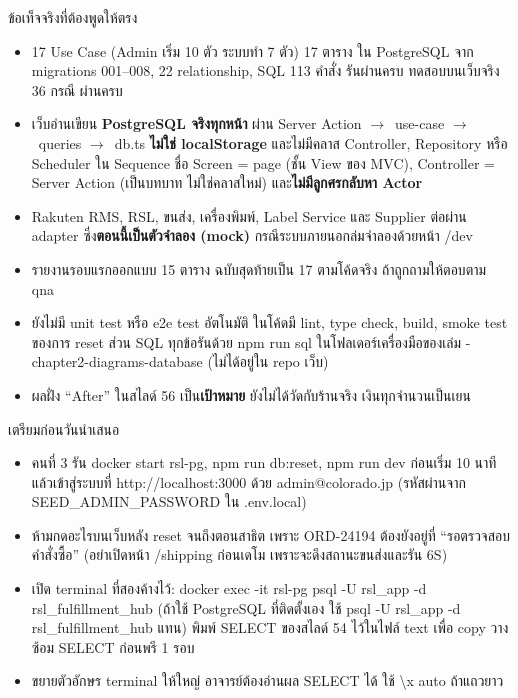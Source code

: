 \documentclass[12pt,a4paper]{article}
\newcommand{\num}[1]{{\heavy\textcolor{cur}{#1}}}
\newcommand{\q}[1]{{\mono #1}}
\newcommand{\ra}{$\rightarrow$}
\begin{document}
\vspace{8pt}
{\heavy\Large ข้อเท็จจริงที่ต้องพูดให้ตรง}\par
\begin{itemize}
  \item \num{17 Use Case} (Admin เริ่ม 10 ตัว ระบบทำ 7 ตัว) \num{17 ตาราง} ใน PostgreSQL จาก migrations 001--008, \num{22 relationship}, SQL \num{113 คำสั่ง} รันผ่านครบ ทดสอบบนเว็บจริง \num{36 กรณี} ผ่านครบ
  \item เว็บอ่านเขียน \textbf{PostgreSQL จริงทุกหน้า} ผ่าน Server Action \ra\ use-case \ra\ queries \ra\ db.ts \textbf{ไม่ใช่ localStorage} และไม่มีคลาส Controller, Repository หรือ Scheduler ใน Sequence ชื่อ Screen = page (ชั้น View ของ MVC), Controller = Server Action (เป็นบทบาท ไม่ใช่คลาสใหม่) และ\textbf{ไม่มีลูกศรกลับหา Actor}
  \item Rakuten RMS, RSL, ขนส่ง, เครื่องพิมพ์, Label Service และ Supplier ต่อผ่าน adapter ซึ่ง\textbf{ตอนนี้เป็นตัวจำลอง (mock)} กรณีระบบภายนอกล่มจำลองด้วยหน้า \q{/dev}
  \item รายงานรอบแรกออกแบบ 15 ตาราง ฉบับสุดท้ายเป็น 17 ตามโค้ดจริง ถ้าถูกถามให้ตอบตาม qna
  \item ยังไม่มี unit test หรือ e2e test อัตโนมัติ ในโค้ดมี lint, type check, build, smoke test ของการ reset ส่วน SQL ทุกข้อรันด้วย \q{npm run sql} ในโฟลเดอร์เครื่องมือของเล่ม \q{04-chapter2-diagrams-database} (ไม่ได้อยู่ใน repo เว็บ)
  \item ผลฝั่ง ``After'' ในสไลด์ 56 เป็น\textbf{เป้าหมาย} ยังไม่ได้วัดกับร้านจริง เงินทุกจำนวนเป็นเยน
\end{itemize}

\vspace{4pt}
{\heavy\Large เตรียมก่อนวันนำเสนอ}\par
\begin{itemize}
  \item คนที่ 3 รัน \q{docker start rsl-pg}, \q{npm run db:reset}, \q{npm run dev} ก่อนเริ่ม 10 นาที แล้วเข้าสู่ระบบที่ \q{http://localhost:3000} ด้วย \q{admin@colorado.jp} (รหัสผ่านจาก \q{SEED\_ADMIN\_PASSWORD} ใน \q{.env.local})
  \item ห้ามกดอะไรบนเว็บหลัง reset จนถึงตอนสาธิต เพราะ ORD-24194 ต้องยังอยู่ที่ ``รอตรวจสอบคำสั่งซื้อ'' (อย่าเปิดหน้า \q{/shipping} ก่อนเดโม เพราะจะดึงสถานะขนส่งและรัน 6S)
  \item เปิด terminal ที่สองค้างไว้: \q{docker exec -it rsl-pg psql -U rsl\_app -d rsl\_fulfillment\_hub} (ถ้าใช้ PostgreSQL ที่ติดตั้งเอง ใช้ \q{psql -U rsl\_app -d rsl\_fulfillment\_hub} แทน) พิมพ์ SELECT ของสไลด์ 54 ไว้ในไฟล์ text เพื่อ copy วาง ซ้อม SELECT ก่อนพรี 1 รอบ
  \item ขยายตัวอักษร terminal ให้ใหญ่ อาจารย์ต้องอ่านผล SELECT ได้ ใช้ \q{\textbackslash x auto} ถ้าแถวยาว
\end{itemize}
\end{document}
